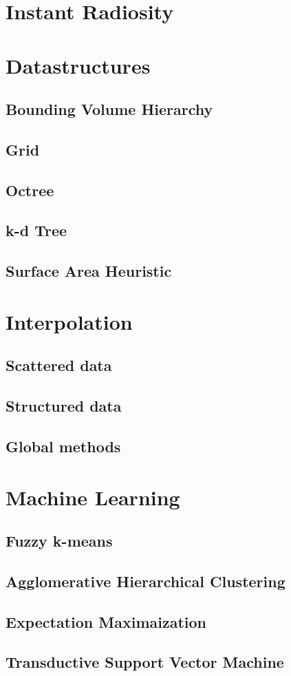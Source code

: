\section{Instant Radiosity}

\section{Datastructures}


\subsection{Bounding Volume Hierarchy}
\subsection{Grid}
\subsection{Octree}
\subsection{k-d Tree}
\subsection{Surface Area Heuristic}

\section{Interpolation}
\subsection{Scattered data}
\subsection{Structured data}

\label{ch:fu:trilinear}
\subsection{Global methods}


\section{Machine Learning}

\subsection{Fuzzy k-means}
\subsection{Agglomerative Hierarchical Clustering}
\subsection{Expectation Maximaization}
\subsection{Transductive Support Vector Machine}